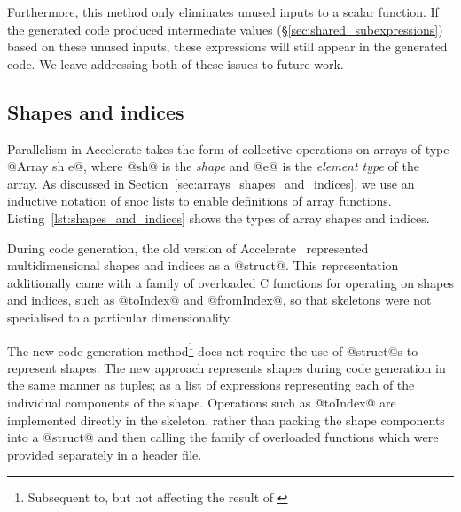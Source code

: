 Furthermore, this method only eliminates unused inputs to a scalar function. If
the generated code produced intermediate values
(\S\ref{sec:shared_subexpressions}) based on these unused inputs, these
expressions will still appear in the generated code. We leave addressing both of
these issues to future work.


\subsection{Shapes and indices}

\cg[shapes|(]{}

Parallelism in Accelerate takes the form of collective operations on arrays of
type @Array sh e@, where @sh@ is the \emph{shape} and @e@ is the \emph{element
type} of the array. As discussed in Section~\ref{sec:arrays_shapes_and_indices},
we use an inductive notation of snoc lists to enable 
definitions of array functions. Listing~\ref{lst:shapes_and_indices} shows the
types of array shapes and indices.

During code generation, the old version of Accelerate~\cite{Chakravarty:2011fr}
represented multidimensional shapes and indices as a @struct@.
%
%
This representation additionally came with a family of overloaded C functions
for operating on shapes and indices, such as @toIndex@ and @fromIndex@, so that
skeletons were not specialised to a particular dimensionality.
%

The new code generation method\footnote{Subsequent to, but not affecting the
result of \cite{CliftonEverest:2014vi}} does not require the use of @struct@s to
represent shapes. The new approach represents shapes during code generation in
the same manner as tuples; as a list of expressions representing each of the
individual components of the shape. Operations such as @toIndex@ are implemented
directly in the skeleton, rather than packing the shape components into a
@struct@ and then calling the family of overloaded functions which were provided
separately in a header file.

